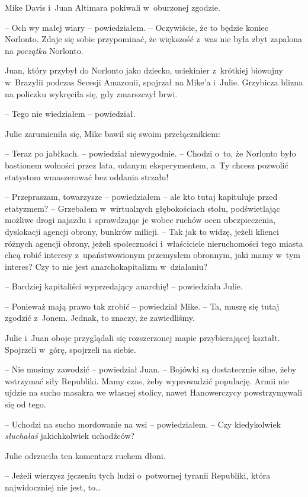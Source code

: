 \documentclass[oneside,polish,11pt,sfheadings]{mwbk}
\begin{document}
Mike Davis i~Juan Altimara pokiwali w~oburzonej zgodzie.

-- Och wy małej wiary -- powiedziałem. -- Oczywiście, że to będzie koniec
Norlonto. Zdaje się sobie przypominać, że większość z~was nie była zbyt
zapalona na \emph{początku} Norlonto.

Juan, który przybył do Norlonto jako dziecko, uciekinier z~krótkiej
biowojny w~Brazylii podczas Secesji Amazonii, spojrzał na Mike'a i~Julie. Grzybicza blizna na policzku wykręciła się, gdy zmarszczył brwi.

-- Tego nie wiedziałem -- powiedział.

Julie zarumieniła się, Mike bawił się swoim przełącznikiem: 

-- Teraz po jabłkach. -- powiedział niewygodnie. -- Chodzi o~to, że Norlonto było
bastionem wolności przez lata, udanym eksperymentem, a~Ty chcesz
pozwolić etatystom wmaszerować bez oddania strzału!

-- Przepraszam, towarzysze -- powiedziałem -- ale kto tutaj kapituluje
przed etatyzmem? -- Grzebałem w~wirtualnych głębokościach stołu,
podświetlając możliwe drogi najazdu i~sprawdzając je wobec ruchów ocen
ubezpieczenia, dyslokacji agencji obrony, bunkrów milicji. -- Tak jak to
widzę, jeżeli klienci różnych agencji obrony, jeżeli społeczności i~właściciele nieruchomości tego miasta chcą robić interesy z~upaństwowionym przemysłem obronnym, jaki mamy w~tym interes? Czy to nie
jest anarchokapitalizm w~działaniu?

-- Bardziej kapitaliści wyprzedający anarchię! -- powiedziała Julie.

-- Ponieważ mają prawo tak zrobić -- powiedział Mike. -- Ta, muszę się
tutaj zgodzić z~Jonem. Jednak, to znaczy, że zawiedliśmy.

Julie i~Juan oboje przyglądali się rozszerzonej mapie przybierającej
kształt. Spojrzeli w~górę, spojrzeli na siebie.

-- Nie musimy zawodzić -- powiedział Juan. -- Bojówki są dostatecznie
silne, żeby wstrzymać siły Republiki. Mamy czas, żeby wyprowadzić
populację. Armii nie ujdzie na sucho masakra we własnej stolicy, nawet
Hanowerczycy powstrzymywali się od tego.

-- Uchodzi na sucho mordowanie na wsi -- powiedziałem. -- Czy kiedykolwiek
\emph{słuchałaś} jakichkolwiek uchodźców?

Julie odrzuciła ten komentarz ruchem dłoni. 

-- Jeżeli wierzysz jęczeniu tych ludzi o~potwornej tyranii Republiki, która najwidoczniej nie jest,
to\ldots
\end{document}
